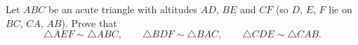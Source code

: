 Let $ABC$ be an acute triangle with altitudes $AD$, $BE$ and $CF$ (so $D$, $E$, $F$ lie on $BC$, $CA$, $AB$). Prove that
\[\triangle AEF\sim\triangle ABC,\qquad\triangle BDF\sim\triangle BAC,\qquad\triangle CDE\sim\triangle CAB.\]
